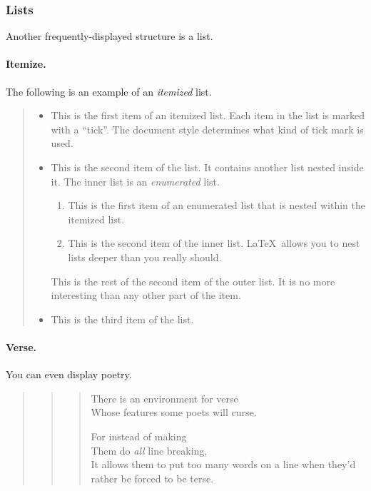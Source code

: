 \subsubsection{Lists}


Another frequently-displayed structure is a list.


\paragraph{Itemize.}
The following is an example of an {\em itemized} list.


\begin{quote}
  \begin{itemize}
    \item  This is the first item of an itemized list.  Each item
    in the list is marked with a ``tick''. The document style determines what
    kind of tick mark is used.


    \item  This is the second item of the list.  It contains another
    list nested inside it. The inner list is an {\em enumerated} list.
    \begin{enumerate}
      \item This is the first item of an enumerated list that
      is nested within the itemized list.


      \item This is the second item of the inner list.  \LaTeX\
      allows you to nest lists deeper than you really should.
    \end{enumerate}
    This is the rest of the second item of the outer list. It is no more
    interesting than any other part of the item.
    \item  This is the third item of the list.
  \end{itemize}
\end{quote}


\paragraph{Verse.}
You can even display poetry.


\begin{quote}
  \begin{quote}
    \begin{verse}
      There is an environment for verse \\
      Whose features some poets will curse.


      For instead of making\\
      Them do {\em all\/} line breaking, \\
      It allows them to put too many words on a line when they'd
      rather be forced to be terse.
    \end{verse}
  \end{quote}
\end{quote}


